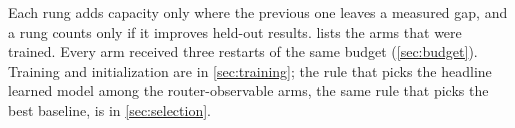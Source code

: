Each rung adds capacity only where the previous one leaves a measured gap, and a rung counts only
if it improves held-out results.  lists the arms that were trained. Every arm
received three restarts of the same budget (\cref{sec:budget}). Training and initialization are in
\cref{sec:training}; the rule that picks the headline learned model among the router-observable
arms, the same rule that picks the best baseline, is in \cref{sec:selection}.

